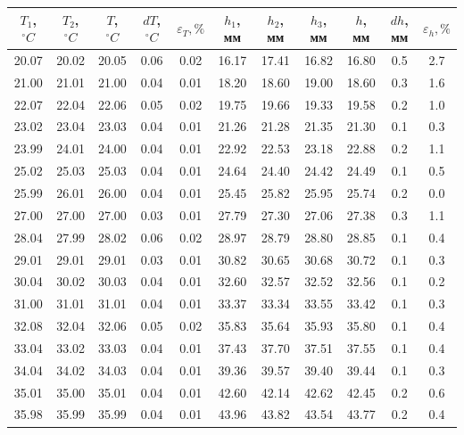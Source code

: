 \documentclass[a4paper,12pt]{article} %
\begin{document}
\begin{enumerate}
  \begin{table}[h]
    \centering
    \begin{tabular}{|cc|c|c|c|ccc|c|c|c|}
        \hline
        $T_1$, $^\circ C$ & $T_2$, $^\circ C$ & $T$, $^\circ C$ & $dT$, $^\circ C$ & $\varepsilon_T, \%$ & $h_1$, мм & $h_2$, мм  & $h_3$, мм  & $h$, мм  & $dh$, мм  & $\varepsilon_h, \%$ \\
        \hline
        20.07 & 20.02 & 20.05 & 0.06 & 0.02 & 16.17 & 17.41 & 16.82 & 16.80 & 0.5 & 2.7 \\
        21.00 & 21.01 & 21.00 & 0.04 & 0.01 & 18.20 & 18.60 & 19.00 & 18.60 & 0.3 & 1.6 \\
        22.07 & 22.04 & 22.06 & 0.05 & 0.02 & 19.75 & 19.66 & 19.33 & 19.58 & 0.2 & 1.0 \\
        23.02 & 23.04 & 23.03 & 0.04 & 0.01 & 21.26 & 21.28 & 21.35 & 21.30 & 0.1 & 0.3 \\
        23.99 & 24.01 & 24.00 & 0.04 & 0.01 & 22.92 & 22.53 & 23.18 & 22.88 & 0.2 & 1.1 \\
        25.02 & 25.03 & 25.03 & 0.04 & 0.01 & 24.64 & 24.40 & 24.42 & 24.49 & 0.1 & 0.5 \\
        25.99 & 26.01 & 26.00 & 0.04 & 0.01 & 25.45 & 25.82 & 25.95 & 25.74 & 0.2 & 0.0 \\
        27.00 & 27.00 & 27.00 & 0.03 & 0.01 & 27.79 & 27.30 & 27.06 & 27.38 & 0.3 & 1.1 \\
        28.04 & 27.99 & 28.02 & 0.06 & 0.02 & 28.97 & 28.79 & 28.80 & 28.85 & 0.1 & 0.4 \\
        29.01 & 29.01 & 29.01 & 0.03 & 0.01 & 30.82 & 30.65 & 30.68 & 30.72 & 0.1 & 0.3 \\
        30.04 & 30.02 & 30.03 & 0.04 & 0.01 & 32.60 & 32.57 & 32.52 & 32.56 & 0.1 & 0.2 \\
        31.00 & 31.01 & 31.01 & 0.04 & 0.01 & 33.37 & 33.34 & 33.55 & 33.42 & 0.1 & 0.3 \\
        32.08 & 32.04 & 32.06 & 0.05 & 0.02 & 35.83 & 35.64 & 35.93 & 35.80 & 0.1 & 0.4 \\
        33.04 & 33.02 & 33.03 & 0.04 & 0.01 & 37.43 & 37.70 & 37.51 & 37.55 & 0.1 & 0.4 \\
        34.04 & 34.02 & 34.03 & 0.04 & 0.01 & 39.36 & 39.57 & 39.40 & 39.44 & 0.1 & 0.3 \\
        35.01 & 35.00 & 35.01 & 0.04 & 0.01 & 42.60 & 42.14 & 42.62 & 42.45 & 0.2 & 0.6 \\
        35.98 & 35.99 & 35.99 & 0.04 & 0.01 & 43.96 & 43.82 & 43.54 & 43.77 & 0.2 & 0.4 \\

\end{tabular}
\end{table}
\end{enumerate}
\end{document}
